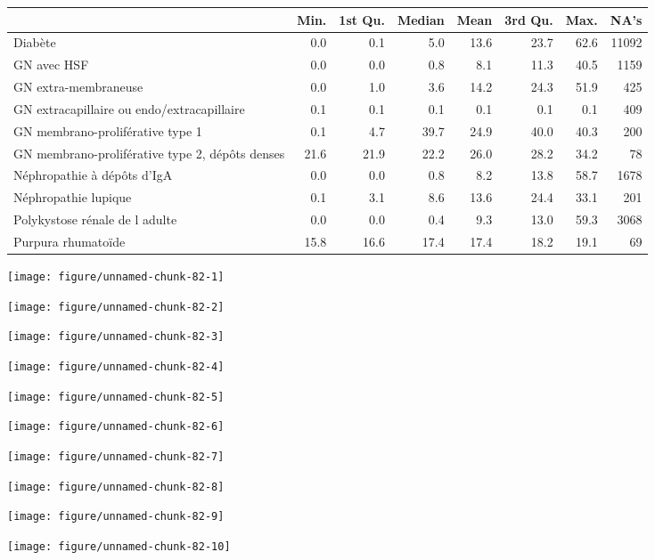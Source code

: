 \documentclass[11pt,a4paper]{article}\usepackage[]{graphicx}\usepackage[]{color}
\makeatletter
\def\maxwidth{ %
  \ifdim\Gin@nat@width>\linewidth
    \linewidth
  \else
    \Gin@nat@width
  \fi
}
\newenvironment{knitrout}{}{} %
\makeatother
\begin{document}
\begin{table}[H]
\centering
\begin{tabular}{lrrrrrrr}
  \hline
 & Min. & 1st Qu. & Median & Mean & 3rd Qu. & Max. & NA's \\ 
  \hline
Diabète & 0.0 & 0.1 & 5.0 & 13.6 & 23.7 & 62.6 & 11092 \\ 
  GN avec HSF & 0.0 & 0.0 & 0.8 & 8.1 & 11.3 & 40.5 & 1159 \\ 
  GN extra-membraneuse & 0.0 & 1.0 & 3.6 & 14.2 & 24.3 & 51.9 & 425 \\ 
  GN extracapillaire ou endo/extracapillaire & 0.1 & 0.1 & 0.1 & 0.1 & 0.1 & 0.1 & 409 \\ 
  GN membrano-proliférative type 1 & 0.1 & 4.7 & 39.7 & 24.9 & 40.0 & 40.3 & 200 \\ 
  GN membrano-proliférative type 2, dépôts denses & 21.6 & 21.9 & 22.2 & 26.0 & 28.2 & 34.2 & 78 \\ 
  Néphropathie à dépôts d'IgA & 0.0 & 0.0 & 0.8 & 8.2 & 13.8 & 58.7 & 1678 \\ 
  Néphropathie lupique & 0.1 & 3.1 & 8.6 & 13.6 & 24.4 & 33.1 & 201 \\ 
  Polykystose rénale de l adulte & 0.0 & 0.0 & 0.4 & 9.3 & 13.0 & 59.3 & 3068 \\ 
  Purpura rhumatoïde & 15.8 & 16.6 & 17.4 & 17.4 & 18.2 & 19.1 & 69 \\ 
   \hline
\end{tabular}
\end{table}


\begin{knitrout}
\color{fgcolor}
\texttt{[image: figure/unnamed-chunk-82-1]} 

\texttt{[image: figure/unnamed-chunk-82-2]} 

\texttt{[image: figure/unnamed-chunk-82-3]} 

\texttt{[image: figure/unnamed-chunk-82-4]} 

\texttt{[image: figure/unnamed-chunk-82-5]} 

\texttt{[image: figure/unnamed-chunk-82-6]} 

\texttt{[image: figure/unnamed-chunk-82-7]} 

\texttt{[image: figure/unnamed-chunk-82-8]} 

\texttt{[image: figure/unnamed-chunk-82-9]} 

\texttt{[image: figure/unnamed-chunk-82-10]} 

\end{knitrout}
\end{document}
